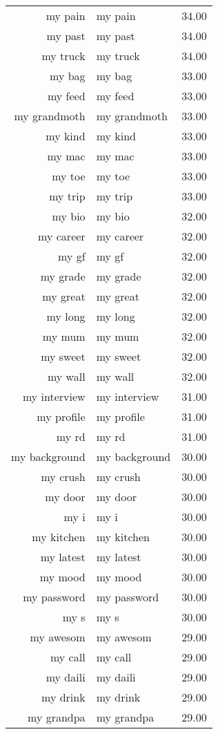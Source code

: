 \begin{table}[ht]
\begin{tabular}{rlr}
  my pain & my pain & 34.00 \\ 
  my past & my past & 34.00 \\ 
  my truck & my truck & 34.00 \\ 
  my bag & my bag & 33.00 \\ 
  my feed & my feed & 33.00 \\ 
  my grandmoth & my grandmoth & 33.00 \\ 
  my kind & my kind & 33.00 \\ 
  my mac & my mac & 33.00 \\ 
  my toe & my toe & 33.00 \\ 
  my trip & my trip & 33.00 \\ 
  my bio & my bio & 32.00 \\ 
  my career & my career & 32.00 \\ 
  my gf & my gf & 32.00 \\ 
  my grade & my grade & 32.00 \\ 
  my great & my great & 32.00 \\ 
  my long & my long & 32.00 \\ 
  my mum & my mum & 32.00 \\ 
  my sweet & my sweet & 32.00 \\ 
  my wall & my wall & 32.00 \\ 
  my interview & my interview & 31.00 \\ 
  my profile & my profile & 31.00 \\ 
  my rd & my rd & 31.00 \\ 
  my background & my background & 30.00 \\ 
  my crush & my crush & 30.00 \\ 
  my door & my door & 30.00 \\ 
  my i & my i & 30.00 \\ 
  my kitchen & my kitchen & 30.00 \\ 
  my latest & my latest & 30.00 \\ 
  my mood & my mood & 30.00 \\ 
  my password & my password & 30.00 \\ 
  my s & my s & 30.00 \\ 
  my awesom & my awesom & 29.00 \\ 
  my call & my call & 29.00 \\ 
  my daili & my daili & 29.00 \\ 
  my drink & my drink & 29.00 \\ 
  my grandpa & my grandpa & 29.00 \\ 

\end{tabular}
\end{table}
